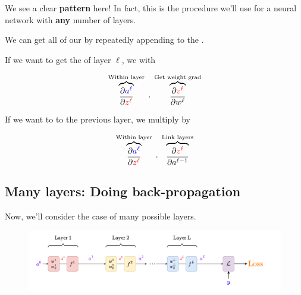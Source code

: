         We see a clear \textbf{pattern} here! In fact, this is the procedure we'll use for a neural network with \textbf{any} number of layers.\\
        
        \begin{concept}
            We can get all of our  by repeatedly appending to the .
            
            If we want to get the  of layer $\ell$, we  with
            
            \begin{equation*}
                \overbrace{
                    \frac{\partial \textcolor{blue}{a^\ell}}{\partial \textcolor{red}{z^\ell}}
                }^{\text{Within layer}}
                    \; \cdot \;
                \overbrace{
                    \frac{\partial \textcolor{red}{z^\ell}}{\partial w^\ell}
                }^{\text{Get weight grad}}
            \end{equation*}
            
            If we want to  to the previous layer, we  multiply by
            
            \begin{equation*}
                \overbrace{
                    \frac{\partial \textcolor{blue}{a^\ell}}{\partial \textcolor{red}{z^\ell}}
                }^{\text{Within layer}}
                    \; \cdot \;
                \overbrace{
                    \frac{\partial \textcolor{red}{z^\ell}}{\partial a^{\ell-1}}
                }^{\text{Link layers}}
            \end{equation*}
            
        \end{concept}
        
    \phantom{}
    
    \subsection{Many layers: Doing back-propagation}
    
        Now, we'll consider the case of many possible layers.
            
        \phantom{ }
            
        \begin{figure}[H]
            \centering
            \includegraphics[width=180mm,scale=0.4]{images/nn_2_images/network_bp.png}
        \end{figure}
        
